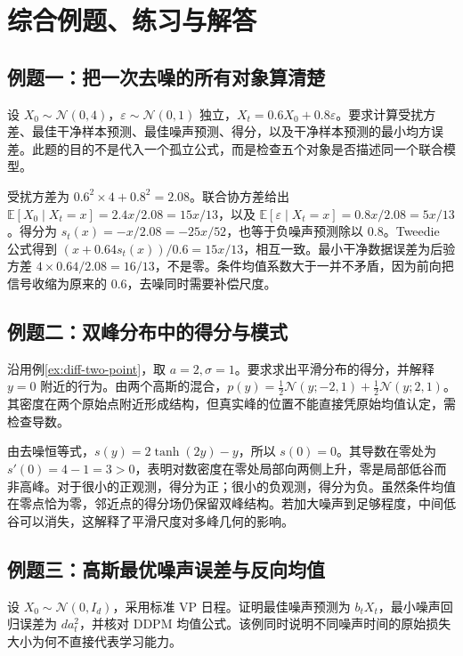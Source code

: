 \documentclass[UTF8,12pt,a4paper,fontset=fandol]{ctexart}
\begin{document}
\section{综合例题、练习与解答}
\label{sec:diff-exercises}
\subsection{例题一：把一次去噪的所有对象算清楚}
设 $X_0\sim\mathcal N(0,4)$，$\varepsilon\sim\mathcal N(0,1)$ 独立，$X_t=0.6X_0+0.8\varepsilon$。要求计算受扰方差、最佳干净样本预测、最佳噪声预测、得分，以及干净样本预测的最小均方误差。此题的目的不是代入一个孤立公式，而是检查五个对象是否描述同一个联合模型。

\begin{solve}
受扰方差为 $0.6^2\times4+0.8^2=2.08$。联合协方差给出 $\mathbb E[X_0\mid X_t=x]=2.4x/2.08=15x/13$，以及 $\mathbb E[\varepsilon\mid X_t=x]=0.8x/2.08=5x/13$。得分为 $s_t(x)=-x/2.08=-25x/52$，也等于负噪声预测除以 $0.8$。Tweedie 公式得到 $(x+0.64s_t(x))/0.6=15x/13$，相互一致。最小干净数据误差为后验方差 $4\times0.64/2.08=16/13$，不是零。条件均值系数大于一并不矛盾，因为前向把信号收缩为原来的 $0.6$，去噪同时需要补偿尺度。
\end{solve}

\subsection{例题二：双峰分布中的得分与模式}
沿用例\ref{ex:diff-two-point}，取 $a=2,\sigma=1$。要求求出平滑分布的得分，并解释 $y=0$ 附近的行为。由两个高斯的混合，$p(y)=\tfrac12\mathcal N(y;-2,1)+\tfrac12\mathcal N(y;2,1)$。其密度在两个原始点附近形成结构，但真实峰的位置不能直接凭原始均值认定，需检查导数。

\begin{solve}
由去噪恒等式，$s(y)=2\tanh(2y)-y$，所以 $s(0)=0$。其导数在零处为 $s'(0)=4-1=3>0$，表明对数密度在零处局部向两侧上升，零是局部低谷而非高峰。对于很小的正观测，得分为正；很小的负观测，得分为负。虽然条件均值在零点恰为零，邻近点的得分场仍保留双峰结构。若加大噪声到足够程度，中间低谷可以消失，这解释了平滑尺度对多峰几何的影响。
\end{solve}

\subsection{例题三：高斯最优噪声误差与反向均值}
设 $X_0\sim\mathcal N(0,I_d)$，采用标准 VP 日程。证明最佳噪声预测为 $b_tX_t$，最小噪声回归误差为 $d a_t^2$，并核对 DDPM 均值公式。该例同时说明不同噪声时间的原始损失大小为何不直接代表学习能力。
\end{document}

